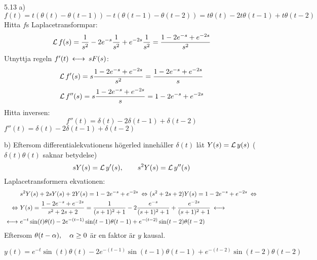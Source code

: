 \begin{task}{5.13 a)}
	\[f(t)=t(\theta(t)-\theta(t-1))-t(\theta(t-1)-\theta(t-2))=t\theta(t)-2t\theta(t-1)+t\theta(t-2)\]
	Hitta $f$s Laplacetransformpar:
	\[\operatorname{\mathcal{L}} f(s)=\frac{1}{s^2}-2e^{-s}\frac{1}{s^2}+e^{-2s}\frac{1}{s^2}=\frac{1-2e^{-s}+e^{-2s}}{s^2}\]
	Utnyttja regeln $f'(t)\llra sF(s)$:
	\[\operatorname{\mathcal{L}} f'(s)=s\frac{1-2e^{-s}+e^{-2s}}{s^2}=\frac{1-2e^{-s}+e^{-2s}}{s}\]
	\[\operatorname{\mathcal{L}} f''(s)=s\frac{1-2e^{-s}+e^{-2s}}{s}=1-2e^{-s}+e^{-2s}\]
	Hitta inversen:
	\[f''(t)=\delta(t)-2\delta(t-1)+\delta(t-2)\]
	\ans $f''(t)=\delta(t)-2\delta(t-1)+\delta(t-2)$
\end{task}

\begin{task}{b)}
	Eftersom differentialekvationens högerled innehåller $\delta(t)$ låt $Y(s)=\operatorname{\mathcal{L}} y(s)$ ($\delta(t)\theta(t)$ saknar betydelse)
	\[sY(s)=\operatorname{\mathcal{L}} y'(s),\qquad s^2Y(s)=\operatorname{\mathcal{L}} y''(s)\]
	Laplacetransformera ekvationen:
	\begin{align*}
	&s^2Y(s)+2sY(s)+2Y(s)=1-2e^{-s}+e^{-2s} \lra
	(s^2+2s+2)Y(s)=1-2e^{-s}+e^{-2s}\lra \\ \lra
	&Y(s)=\frac{1-2e^{-s}+e^{-2s}}{s^2+2s+2}=
	\frac{1}{(s+1)^2+1}-2\frac{e^{-s}}{(s+1)^2+1}+\frac{e^{-2s}}{(s+1)^2+1} \llra \\ \llra
	&e^{-t}\sin(t)\theta(t)-2e^{-(t-1)}\sin(t-1)\theta(t-1)+e^{-(t-2)}\sin(t-2)\theta(t-2)
	\end{align*}
	Eftersom $\theta(t-\alpha), \quad \alpha \ge 0$ är en faktor är $y$ kausal.
	
	\ans $y(t)=e^{-t}\sin(t)\theta(t)-2e^{-(t-1)}\sin(t-1)\theta(t-1)+e^{-(t-2)}\sin(t-2)\theta(t-2)$
\end{task}

